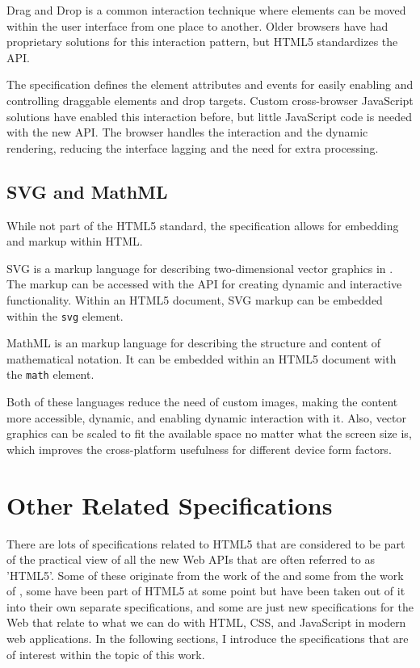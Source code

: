 Drag and Drop is a common interaction technique where elements can be
moved within the user interface from one place to another. Older
browsers have had proprietary solutions for this interaction pattern,
but HTML5 standardizes the API.

The specification defines the element attributes and  events
for easily enabling and controlling draggable elements and drop
targets. Custom cross-browser JavaScript solutions have enabled this
interaction before, but little JavaScript code is needed with the new
API. The browser handles the interaction and the dynamic rendering,
reducing the interface lagging and the need for extra processing.

\section{SVG and MathML}

While not part of the HTML5 standard, the specification allows for
embedding  \cite{SVGTiny12} and  \cite{MathML}
markup within HTML.

SVG is a markup language for describing two-dimensional vector
graphics in . The markup can be accessed with the 
API for creating dynamic and interactive functionality. Within an
HTML5 document, SVG markup can be embedded within the \texttt{svg}
element.

MathML is an  markup language for describing the structure
and content of mathematical notation. It can be embedded within an
HTML5 document with the \texttt{math} element.

Both of these languages reduce the need of custom images, making the
content more accessible, dynamic, and enabling dynamic interaction
with it. Also, vector graphics can be scaled to fit the available
space no matter what the screen size is, which improves the
cross-platform usefulness for different device form factors.

\chapter{Other Related Specifications}
\label{chapter:other-related-specifications}

There are lots of specifications related to HTML5 that are considered
to be part of the practical view of all the new Web APIs that are
often referred to as 'HTML5'. Some of these originate from the work of
the  and some from the work of , some have been
part of HTML5 at some point but have been taken out of it into their
own separate specifications, and some are just new specifications for
the Web that relate to what we can do with HTML, CSS, and JavaScript
in modern web applications. In the following sections, I introduce the
specifications that are of interest within the topic of this work.


